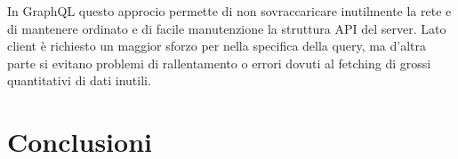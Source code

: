 In GraphQL questo approcio permette di non sovraccaricare inutilmente la rete e di mantenere ordinato e di facile manutenzione la struttura API del server. Lato client è richiesto un maggior sforzo per nella specifica della query, ma d'altra parte si evitano problemi di rallentamento o errori dovuti al fetching di grossi quantitativi di dati inutili. 
\section{Conclusioni}





